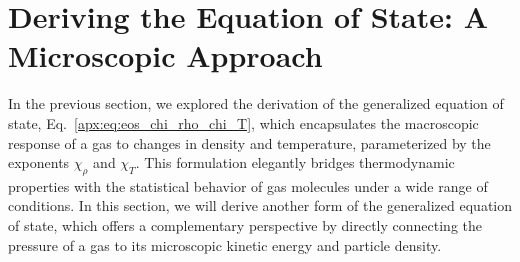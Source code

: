 \documentclass[main.tex]{subfiles}
\begin{document}
\section{Deriving the Equation of State: A Microscopic Approach}
In the previous section, we explored the derivation of the generalized equation of state, Eq.~\eqref{apx:eq:eos_chi_rho_chi_T}, which encapsulates the macroscopic response of a gas to changes in density and temperature, parameterized by the exponents $\chi_\rho$ and $\chi_T$. This formulation elegantly bridges thermodynamic properties with the statistical behavior of gas molecules under a wide range of conditions. In this section, we will derive another form of the generalized equation of state, which offers a complementary perspective by directly connecting the pressure of a gas to its microscopic kinetic energy and particle density.
\end{document}
